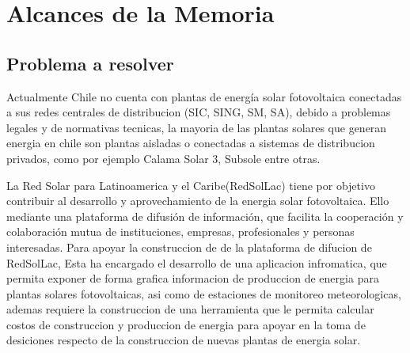\chapter{Alcances de la Memoria}
\label{alcances}

\section{Problema a resolver}

Actualmente Chile no cuenta con plantas de energía solar fotovoltaica conectadas a sus redes centrales de distribucion (SIC, SING, SM, SA), debido a problemas legales y de normativas tecnicas, la mayoria de las plantas solares que generan energia en chile son plantas aisladas o conectadas a sistemas de distribucion privados, como por ejemplo Calama Solar 3\cite{plantaSolar:1}, Subsole\cite{subsole:2,} entre otras.

La Red Solar para Latinoamerica y el Caribe(RedSolLac) tiene por objetivo contribuir al desarrollo y aprovechamiento de la energia solar fotovoltaica. Ello mediante una plataforma de difusión de información, que facilita la cooperación y colaboración mutua de instituciones, empresas, profesionales y personas interesadas.
Para apoyar la construccion de de la plataforma de difucion de RedSolLac, Esta ha encargado el desarrollo de una aplicacion infromatica, que permita exponer de forma grafica informacion de produccion de energia para plantas solares fotovoltaicas, asi como de estaciones de monitoreo meteorologicas, ademas requiere la construccion de una herramienta que le permita calcular costos de construccion y produccion de energia para apoyar en la toma de desiciones respecto de la construccion de nuevas plantas de energia solar.

